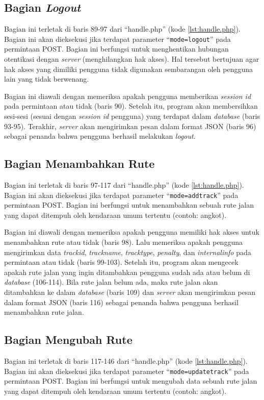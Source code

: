 \subsection{Bagian \textit{Logout}}
\label{sec:bagianlogout}
Bagian ini terletak di baris 89-97 dari ``handle.php'' (kode \ref{lst:handle.php}). Bagian ini akan dieksekusi jika terdapat parameter ``\texttt{mode=logout}'' pada permintaan POST. Bagian ini berfungsi untuk menghentikan hubungan otentikasi dengan \textit{server} (menghilangkan hak akses). Hal tersebut bertujuan agar hak akses yang dimiliki pengguna tidak digunakan sembarangan oleh pengguna lain yang tidak berwenang.

Bagian ini diawali dengan memeriksa apakah pengguna memberikan \textit{session id} pada permintaan atau tidak (baris 90). Setelah itu, program akan membersihkan sesi-sesi (sesuai dengan \textit{session id} pengguna) yang terdapat dalam \textit{database} (baris 93-95). Terakhir, \textit{server} akan mengirimkan pesan dalam format JSON (baris 96) sebagai penanda bahwa pengguna berhasil melakukan \textit{logout}.

\subsection{Bagian Menambahkan Rute}
\label{sec:menambahkanrute}
Bagian ini terletak di baris 97-117 dari ``handle.php'' (kode \ref{lst:handle.php}). Bagian ini akan dieksekusi jika terdapat parameter ``\texttt{mode=addtrack}'' pada permintaan POST. Bagian ini berfungsi untuk menambahkan sebuah rute jalan yang dapat ditempuh oleh kendaraan umum tertentu (contoh: angkot).

Bagian ini diawali dengan memeriksa apakah pengguna memiliki hak akses untuk menambahkan rute atau tidak (baris 98). Lalu memeriksa apakah pengguna mengirimkan data \textit{trackid}, \textit{trackname}, \textit{tracktype}, \textit{penalty}, dan \textit{internalinfo} pada permintaan atau tidak (baris 99-103). Setelah itu, program akan mengecek apakah rute jalan yang ingin ditambahkan pengguna sudah ada atau belum di \textit{database} (106-114). Bila rute jalan belum ada, maka rute jalan akan ditambahkan ke dalam \textit{database} (baris 109) dan \textit{server} akan mengirimkan pesan dalam format JSON (baris 116) sebagai penanda bahwa pengguna berhasil menambahkan rute jalan.

\subsection{Bagian Mengubah Rute}
\label{sec:mengubahrute}
Bagian ini terletak di baris 117-146 dari ``handle.php'' (kode \ref{lst:handle.php}). Bagian ini akan dieksekusi jika terdapat parameter ``\texttt{mode=updatetrack}'' pada permintaan POST. Bagian ini berfungsi untuk mengubah data sebuah rute jalan yang dapat ditempuh oleh kendaraan umum tertentu (contoh: angkot).

